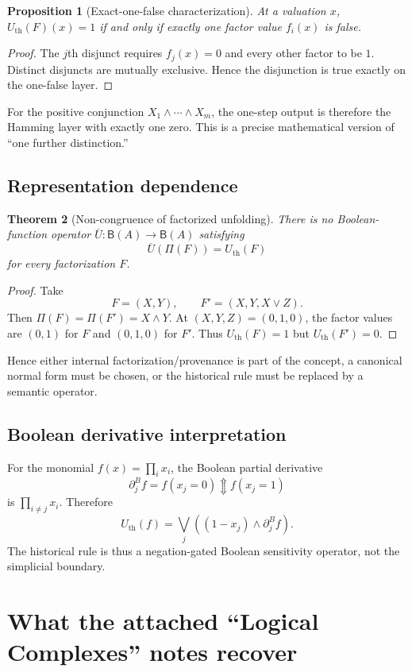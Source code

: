 \documentclass[11pt]{article}
\newtheorem{theorem}{Theorem}[section]
\newtheorem{proposition}[theorem]{Proposition}
\newcommand{\Updown}{\mathbin{\Updownarrow}}
\begin{document}
\begin{proposition}[Exact-one-false characterization]
At a valuation $x$, $U_{\mathrm{th}}(F)(x)=1$ if and only if exactly one factor value $f_i(x)$ is false.
\end{proposition}
\begin{proof}
The $j$th disjunct requires $f_j(x)=0$ and every other factor to be $1$.  Distinct disjuncts are mutually exclusive.  Hence the disjunction is true exactly on the one-false layer.
\end{proof}

For the positive conjunction $X_1\wedge\cdots\wedge X_m$, the one-step output is therefore the Hamming layer with exactly one zero.  This is a precise mathematical version of ``one further distinction.''

\subsection{Representation dependence}

\begin{theorem}[Non-congruence of factorized unfolding]\label{thm:noncongruence}
There is no Boolean-function operator $\overline U:\mathsf B(A)\to\mathsf B(A)$ satisfying
\[
\overline U(\Pi(F))=U_{\mathrm{th}}(F)
\]
for every factorization $F$.
\end{theorem}
\begin{proof}
Take
\[
F=(X,Y),\qquad F'=(X,Y,X\vee Z).
\]
Then $\Pi(F)=\Pi(F')=X\wedge Y$.  At $(X,Y,Z)=(0,1,0)$, the factor values are $(0,1)$ for $F$ and $(0,1,0)$ for $F'$.  Thus $U_{\mathrm{th}}(F)=1$ but $U_{\mathrm{th}}(F')=0$.
\end{proof}

Hence either internal factorization/provenance is part of the concept, a canonical normal form must be chosen, or the historical rule must be replaced by a semantic operator.

\subsection{Boolean derivative interpretation}
For the monomial $f(x)=\prod_i x_i$, the Boolean partial derivative
\[
\partial_j^Bf=f(x_j=0)\Updown f(x_j=1)
\]
is $\prod_{i\neq j}x_i$.  Therefore
\[
U_{\mathrm{th}}(f)
=\bigvee_j\left((1-x_j)\wedge\partial_j^Bf\right).
\]
The historical rule is thus a negation-gated Boolean sensitivity operator, not the simplicial boundary.

\section{What the attached ``Logical Complexes'' notes recover}
\end{document}
